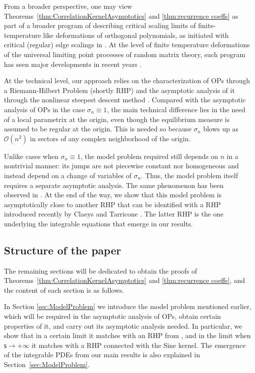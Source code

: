 \documentclass[reqno,a4paper,11pt]{amsart}
\newcommand{\Boh}{\mathcal{O}}
\newcommand{\msf}{\mathsf}
\newcommand{\sad}{\msf s}
\theoremstyle{definition}
\theoremstyle{remark}
\numberwithin{equation}{section}
\begin{document}
From a broader perspective, one may view Theorems~\ref{thm:CorrelationKernelAsymptotics} and \ref{thm:recurrence coeffs} as part of a broader program of describing critical scaling limits of finite-temperature like deformations of orthogonal polynomials, as initiated with critical (regular) edge scalings in \cite{GhosalSilva22}. At the level of finite temperature deformations of the universal limiting point processes of random matrix theory, such program has seen major developments in recent years \cite{CafassoClaeysRuzza2021, Ruzza2024, ClaeysTarricone24, BothnerCafassoTarricone2021, CafassoRuzza23, CafassoPinheiro25, KimuraNavand24}.

At the technical level, our approach relies on the characterization of OPs through a Riemann-Hilbert Problem \cite{Fokas1992} (shortly RHP) and the asymptotic analysis of it through the nonlinear steepest descent method \cite{deift_zhou, deift_book}. Compared with the asymptotic analysis of OPs in the case $\sigma_n\equiv 1$, the main technical difference lies in the need of a local parametrix at the origin, even though the equilibrium measure is assumed to be regular at the origin. This is needed so because $\sigma_n$ blows up as $\Boh(n^2)$ in sectors of any complex neighborhood of the origin.

Unlike cases when $\sigma_n\equiv 1$, the model problem required still depends on $n$ in a nontrivial manner: its jumps are not piecewise constant nor homogeneous and instead depend on a change of variables of $\sigma_n$. Thus, the model problem itself requires a separate asymptotic analysis. The same phenomenon has been observed in \cite{GhosalSilva22}. At the end of the way, we show that this model problem is asymptotically close to another RHP that can be identified with a RHP introduced recently by Claeys and Tarricone \cite{ClaeysTarricone24}. The latter RHP is the one underlying the integrable equations that emerge in our results.

\subsection{Structure of the paper}\hfill 

The remaining sections will be dedicated to obtain the proofs of Theorems~\ref{thm:CorrelationKernelAsymptotics} and \ref{thm:recurrence coeffs}, and the content of each section is as follows. 

In Section \ref{sec:ModelProblem} we introduce the model problem mentioned earlier, which will be required in the asymptotic analysis of OPs, obtain certain properties of it, and carry out its asymptotic analysis needed. In particular, we show that in a certain limit it matches with an RHP from \cite{ClaeysTarricone24}, and in the limit when $\sad\to +\infty$ it matches with a RHP connected with the Sine kernel. The emergence of the integrable PDEs from our main results is also explained in Section~\ref{sec:ModelProblem}.
\end{document}
